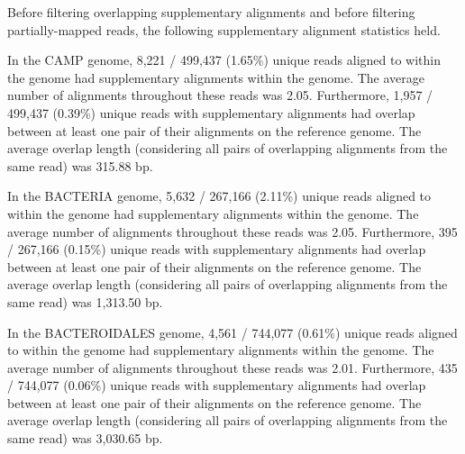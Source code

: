 Before filtering overlapping supplementary alignments and before filtering
partially-mapped reads, the following supplementary alignment statistics held.

In the CAMP genome, 8,221 / 499,437 (1.65\%) unique reads aligned to within the genome had supplementary alignments within the genome. The average number of alignments throughout these reads was 2.05.
Furthermore, 1,957 / 499,437 (0.39\%) unique reads with supplementary alignments had overlap between at least one pair of their alignments on the reference genome.
The average overlap length (considering all pairs of overlapping alignments from the same read) was 315.88 bp.

In the BACTERIA genome, 5,632 / 267,166 (2.11\%) unique reads aligned to within the genome had supplementary alignments within the genome. The average number of alignments throughout these reads was 2.05.
Furthermore, 395 / 267,166 (0.15\%) unique reads with supplementary alignments had overlap between at least one pair of their alignments on the reference genome.
The average overlap length (considering all pairs of overlapping alignments from the same read) was 1,313.50 bp.

In the BACTEROIDALES genome, 4,561 / 744,077 (0.61\%) unique reads aligned to within the genome had supplementary alignments within the genome. The average number of alignments throughout these reads was 2.01.
Furthermore, 435 / 744,077 (0.06\%) unique reads with supplementary alignments had overlap between at least one pair of their alignments on the reference genome.
The average overlap length (considering all pairs of overlapping alignments from the same read) was 3,030.65 bp.
\endinput